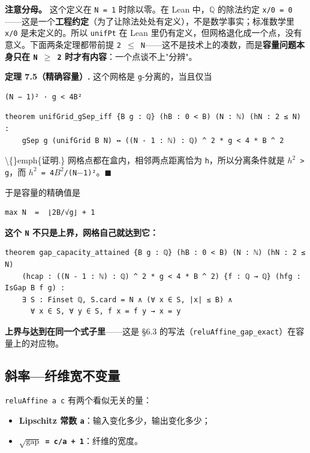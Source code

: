 \documentclass[11pt,a4paper]{ctexart}
\begin{document}
\textbf{注意分母。} 这个定义在 \texttt{N = 1} 时除以零。在 Lean 中，\texttt{\ensuremath{\mathbb{Q}}} 的除法约定 \texttt{x/0 = 0}——这是一个\textbf{工程约定}（为了让除法处处有定义），不是数学事实；标准数学里 \texttt{x/0} 是未定义的。所以 \texttt{unifPt} 在 Lean 里仍有定义，但网格退化成一个点，没有意义。下面两条定理都带前提 \texttt{2 \ensuremath{\le} N}——这不是技术上的凑数，而是\textbf{容量问题本身只在 \texttt{N \ensuremath{\ge} 2} 时才有内容}：一个点谈不上"分辨"。

\textbf{定理 7.5（精确容量）.} 这个网格是 \texttt{g}-分离的，当且仅当

\begin{lstlisting}
(N − 1)² · g < 4B²
\end{lstlisting}

\begin{lstlisting}
theorem unifGrid_gSep_iff {B g : ℚ} (hB : 0 < B) (N : ℕ) (hN : 2 ≤ N) :
    gSep g (unifGrid B N) ↔ ((N - 1 : ℕ) : ℚ) ^ 2 * g < 4 * B ^ 2
\end{lstlisting}

\textbackslash\{\}emph\{证明.\} 网格点都在盒内，相邻两点距离恰为 \texttt{h}，所以分离条件就是 \texttt{\ensuremath{h^{2}} > g}，而 \texttt{\ensuremath{h^{2}} = 4\ensuremath{B^{2}}/(N\ensuremath{-}1)²}。\ensuremath{\ensuremath{\blacksquare}}

于是容量的精确值是

\begin{lstlisting}
max N  =  ⌊2B/√g⌋ + 1
\end{lstlisting}

\textbf{这个 \texttt{N} 不只是上界，网格自己就达到它：}

\begin{lstlisting}
theorem gap_capacity_attained {B g : ℚ} (hB : 0 < B) (N : ℕ) (hN : 2 ≤ N)
    (hcap : ((N - 1 : ℕ) : ℚ) ^ 2 * g < 4 * B ^ 2) {f : ℚ → ℚ} (hfg : IsGap B f g) :
    ∃ S : Finset ℚ, S.card = N ∧ (∀ x ∈ S, |x| ≤ B) ∧
      ∀ x ∈ S, ∀ y ∈ S, f x = f y → x = y
\end{lstlisting}

\textbf{上界与达到在同一个式子里}——这是 §6.3 的写法（\texttt{reluAffine\_gap\_exact}）在容量上的对应物。

\subsection{斜率—纤维宽不变量}

\texttt{reluAffine a c} 有两个看似无关的量：

\begin{itemize}
\item \textbf{Lipschitz 常数 \texttt{a}}：输入变化多少，输出变化多少；
\item \textbf{\texttt{\ensuremath{\sqrt{\mathrm{gap}}} = c/a + 1}}：纤维的宽度。
\end{itemize}
\end{document}
